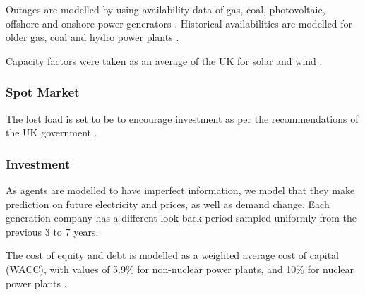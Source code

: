 Outages are modelled by using availability data of gas, coal, photovoltaic, offshore and onshore power generators \cite{Ltd2016, Hunt2015, carroll-j}. Historical availabilities are modelled for older gas, coal and hydro power plants \cite{AlbertaSystemElectricOperator2016}.

Capacity factors were taken as an average of the UK for solar and wind \cite{Pfenninger2016, Staffell2016}.






\subsubsection{Spot Market}

The lost load is set to be  to encourage investment as per the recommendations of the UK government \cite{DECC2013}.

\subsubsection{Investment}

As agents are modelled to have imperfect information, we model that they make prediction on future electricity and  prices, as well as demand change. Each generation company has a different look-back period sampled uniformly from the previous 3 to 7 years.


The cost of equity and debt is modelled as a weighted average cost of capital (WACC), with values of 5.9\% for non-nuclear power plants, and 10\% for nuclear power plants \cite{KPMG2017, Paper2012}. 





